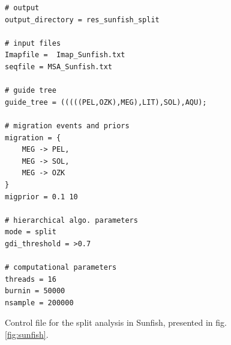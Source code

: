 \documentclass[A4]{article1}
\begin{document}
\begin{figure}[h]
	\footnotesize
	\begin{verbatim}
# output
output_directory = res_sunfish_split

# input files
Imapfile =  Imap_Sunfish.txt
seqfile = MSA_Sunfish.txt

# guide tree
guide_tree = (((((PEL,OZK),MEG),LIT),SOL),AQU);

# migration events and priors
migration = {
    MEG -> PEL,
    MEG -> SOL,
    MEG -> OZK
}
migprior = 0.1 10

# hierarchical algo. parameters
mode = split
gdi_threshold = >0.7

# computational parameters
threads = 16
burnin = 50000
nsample = 200000
	\end{verbatim}
	
	\caption{Control file for the split analysis in Sunfish, presented in fig. \ref{fig:sunfish}. %
	} \label{fig:sunfish_mcf_split}
\end{figure}

\clearpage
\newpage
\end{document}
